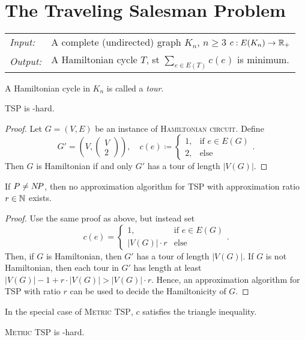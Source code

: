 \documentclass[../skript.tex]{subfiles}
\begin{document}
\chapter{The Traveling Salesman Problem} %
\label{sec:c6}
\begin{problem}
\begin{tabular}{@{}ll}
\textit{Input:} & A complete (undirected) graph $K_n$, $n \geq 3$ $c : E(K_n) \to \mathbb{R}_+$ \\
\textit{Output:} & A Hamiltonian cycle $T$, \ac{st} $\sum_{e \in E(T)} c(e)$ is minimum.
\end{tabular}
\end{problem}
A Hamiltonian cycle in $K_n$ is called a \emph{tour}.
\begin{theorem} %
TSP is \NP-hard.
\end{theorem}
\begin{proof}
Let $G = (V, E)$ be an instance of \textsc{Hamiltonian circuit}.
Define
\[
	G' = \left( V, \begin{pmatrix}
	V \\ 2
	\end{pmatrix} \right), \quad c(e) \coloneqq \begin{cases}
	1, & \text{if } e \in E(G) \\
	2, & \text{else}
	\end{cases}.
\]
Then $G$ is Hamiltonian if and only $G'$ has a tour of length $|V(G)|$.
\end{proof}
\begin{theorem} %
If $P \neq N \! P$, then no approximation algorithm for TSP with approximation ratio $r \in \mathbb{N}$ exists.
\end{theorem}
\begin{proof}
Use the same proof as above, but instead set
\[
	c(e) = \begin{cases}
	1, & \text{if } e \in E(G) \\
	|V(G)| \cdot r & \text{else}
	\end{cases}.
\]
Then, if $G$ is Hamiltonian, then $G'$ has a tour of length $|V(G)|$. If $G$ is not Hamiltonian, then each tour in $G'$ has length at least $|V(G)| - 1 + r \cdot |V(G)| > |V(G)| \cdot r$.
Hence, an approximation algorithm for TSP with ratio $r$ can be used to decide the Hamiltonicity of $G$.
\end{proof}
In the special case of \textsc{Metric TSP}, $c$ satisfies the triangle inequality.
\begin{theorem} %
\textsc{Metric TSP} is \NP-hard.
\end{theorem}
\end{document}
